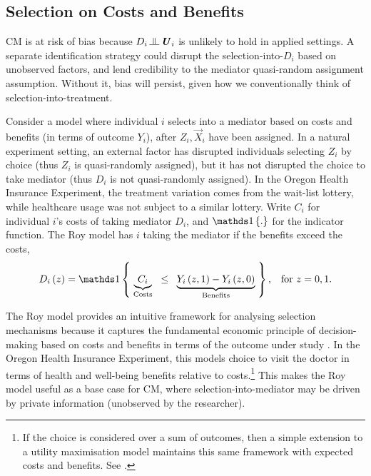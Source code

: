 \subsection{Selection on Costs and Benefits}
CM is at risk of bias because $D_i \indep  \vec U_i$ %
is unlikely to hold in applied settings.
A separate identification strategy could disrupt the selection-into-$D_i$ based on unobserved factors, and lend credibility to the mediator quasi-random assignment assumption.
Without it, bias will persist, given how we conventionally think of selection-into-treatment.

Consider a model where individual $i$ selects into a mediator based on costs and benefits (in terms of outcome $Y_i$), after $Z_i, \vec X_i$ have been assigned.
In a natural experiment setting, an external factor has disrupted individuals selecting $Z_i$ by choice (thus $Z_i$ is quasi-randomly assigned), but it has not disrupted the choice to take mediator (thus $D_i$ is not quasi-randomly assigned).
In the Oregon Health Insurance Experiment, the treatment variation comes from the wait-list lottery, while healthcare usage was not subject to a similar lottery.
Write $C_i$ for individual $i$'s costs of taking mediator $D_i$, and $\indicator{.}$ for the indicator function.
The Roy model has $i$ taking the mediator if the benefits exceed the costs,
\begin{equation}
    \label{eqn:roy-model}
    D_i \left( z \right) = \indicator{ \;
    \underbrace{C_i}_{\text{Costs}} \;\; \leq \;\;
        \underbrace{
            Y_i\left( z, 1 \right) - Y_i\left( z, 0 \right)}_{\text{Benefits}}
    \;}, \;\;\; \text{for } z=0,1.
\end{equation}

The Roy model provides an intuitive framework for analysing selection mechanisms because it captures the fundamental economic principle of decision-making based on costs and benefits in terms of the outcome under study \citep{roy1951some,heckman1990empirical}.
In the Oregon Health Insurance Experiment, this models choice to visit the doctor in terms of health and well-being benefits relative to costs.\footnote{
    If the choice is considered over a sum of outcomes, then a simple extension to a utility maximisation model maintains this same framework with expected costs and benefits.
    See \cite{heckman1990empirical,eisenhauer2015generalized}.
}
This makes the Roy model useful as a base case for CM, where selection-into-mediator may be driven by private information (unobserved by the researcher).

